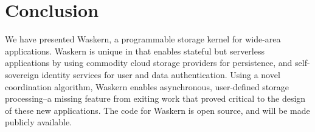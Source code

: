 \section{Conclusion}
\label{sec:conclusion}

We have presented Waskern, a programmable storage kernel for wide-area
applications.  Waskern is unique in that enables stateful but serverless
applications by using commodity cloud storage providers for
persistence, and self-sovereign identity services for user and
data authentication.  Using a novel coordination algorithm, Waskern enables
asynchronous, user-defined storage processing--a missing feature from exiting
work that proved critical to the design of these new applications.
The code for Waskern is open source, and will be made publicly available.
